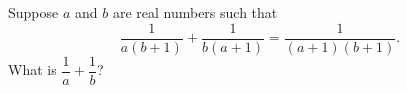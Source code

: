 Suppose $a$ and $b$ are real numbers such that
\[
\dfrac{1}{a(b+1)}+\dfrac{1}{b(a+1)}=\dfrac{1}{(a+1)(b+1)} .
\]
What is $\dfrac{1}{a}+\dfrac{1}{b}$?
